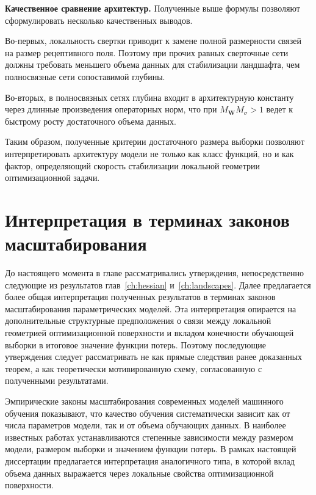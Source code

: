 \textbf{Качественное сравнение архитектур.} Полученные выше формулы позволяют сформулировать несколько качественных выводов.

Во-первых, локальность свертки приводит к замене полной размерности связей на размер рецептивного поля. Поэтому при прочих равных сверточные сети должны требовать меньшего объема данных для стабилизации ландшафта, чем полносвязные сети сопоставимой глубины.

Во-вторых, в полносвязных сетях глубина входит в архитектурную константу через длинные произведения операторных норм, что при $M_{\mathbf W}M_{\sigma}>1$ ведет к быстрому росту достаточного объема данных.

Таким образом, полученные критерии достаточного размера выборки позволяют интерпретировать архитектуру модели не только как класс функций, но и как фактор, определяющий скорость стабилизации локальной геометрии оптимизационной задачи.

\section{Интерпретация в терминах законов масштабирования}\label{sec:scaling-laws-main}

До настоящего момента в главе рассматривались утверждения, непосредственно следующие из результатов глав~\ref{ch:hessian} и~\ref{ch:landscapes}. Далее предлагается более общая интерпретация полученных результатов в терминах законов масштабирования параметрических моделей. Эта интерпретация опирается на дополнительные структурные предположения о связи между локальной геометрией оптимизационной поверхности и вкладом конечности обучающей выборки в итоговое значение функции потерь. Поэтому последующие утверждения следует рассматривать не как прямые следствия ранее доказанных теорем, а как теоретически мотивированную схему, согласованную с полученными результатами.

Эмпирические законы масштабирования современных моделей машинного обучения показывают, что качество обучения систематически зависит как от числа параметров модели, так и от объема обучающих данных. В наиболее известных работах устанавливаются степенные зависимости между размером модели, размером выборки и значением функции потерь. В рамках настоящей диссертации предлагается интерпретация аналогичного типа, в которой вклад объема данных выражается через локальные свойства оптимизационной поверхности.

